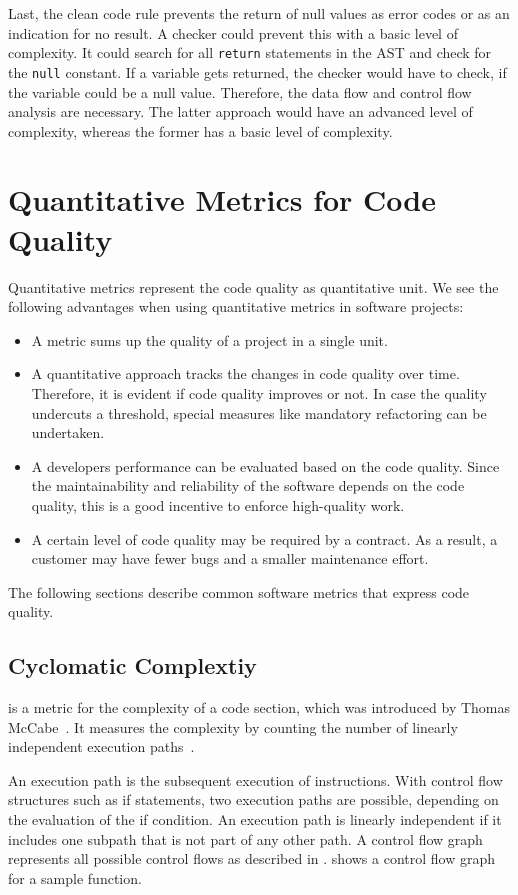 Last, the clean code rule prevents the return of null values as error codes or as an indication for no result. A checker could prevent this with a basic level of complexity. It could search for all \texttt{return} statements in the AST and check for the \texttt{null} constant. If a variable gets returned, the checker would have to check, if the variable could be a null value. Therefore, the data flow and control flow analysis are necessary. The latter approach would have an advanced level of complexity, whereas the former has a basic level of complexity. 

\section{Quantitative Metrics for Code Quality}
Quantitative metrics represent the code quality as quantitative unit. We see the following advantages when using quantitative metrics in software projects:
\begin{itemize}
    \item A metric sums up the quality of a project in a single unit.
    \item A quantitative approach tracks the changes in code quality over time. Therefore, it is evident if code quality improves or not. In case the quality undercuts a threshold, special measures like mandatory refactoring can be undertaken.
    \item A developers performance can be evaluated based on the code quality. Since the maintainability and reliability of the software depends on the code quality, this is a good incentive to enforce high-quality work.
    \item A certain level of code quality may be required by a contract. As a result, a customer may have fewer bugs and a smaller maintenance effort.
\end{itemize}
The following sections describe common software metrics that express code quality.

\subsection{Cyclomatic Complextiy}\label{sec:cyclomatic_complexity}
 is a metric for the complexity of a code section, which was introduced by Thomas McCabe~\cite{mccabe_complexity_1976}. It measures the complexity by counting the number of linearly independent execution paths~\cite{mccabe_complexity_1976}. 

An execution path is the subsequent execution of instructions. With control flow structures such as if statements, two execution paths are possible, depending on the evaluation of the if condition. An execution path is linearly independent if it includes one subpath that is not part of any other path. A control flow graph represents all possible control flows as described in .  shows a control flow graph for a sample function.

